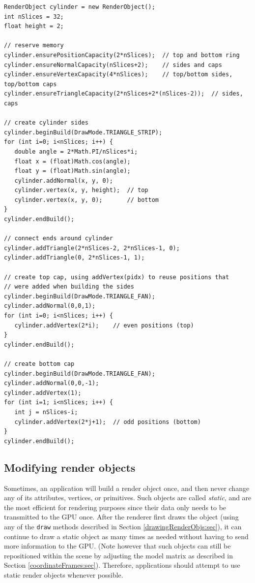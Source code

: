 %
\begin{lstlisting}[caption={Building a cylinder.}, label=renderObjCylinder:lst]
RenderObject cylinder = new RenderObject();
int nSlices = 32;
float height = 2;
      
// reserve memory
cylinder.ensurePositionCapacity(2*nSlices);  // top and bottom ring
cylinder.ensureNormalCapacity(nSlices+2);    // sides and caps
cylinder.ensureVertexCapacity(4*nSlices);    // top/bottom sides, top/bottom caps
cylinder.ensureTriangleCapacity(2*nSlices+2*(nSlices-2));  // sides, caps
      
// create cylinder sides
cylinder.beginBuild(DrawMode.TRIANGLE_STRIP);
for (int i=0; i<nSlices; i++) {
   double angle = 2*Math.PI/nSlices*i;
   float x = (float)Math.cos(angle);
   float y = (float)Math.sin(angle);
   cylinder.addNormal(x, y, 0);
   cylinder.vertex(x, y, height);  // top
   cylinder.vertex(x, y, 0);       // bottom
}
cylinder.endBuild();

// connect ends around cylinder
cylinder.addTriangle(2*nSlices-2, 2*nSlices-1, 0);
cylinder.addTriangle(0, 2*nSlices-1, 1);
      
// create top cap, using addVertex(pidx) to reuse positions that 
// were added when building the sides 
cylinder.beginBuild(DrawMode.TRIANGLE_FAN);
cylinder.addNormal(0,0,1);
for (int i=0; i<nSlices; i++) {
   cylinder.addVertex(2*i);    // even positions (top)
}
cylinder.endBuild();

// create bottom cap
cylinder.beginBuild(DrawMode.TRIANGLE_FAN);
cylinder.addNormal(0,0,-1);
cylinder.addVertex(1);
for (int i=1; i<nSlices; i++) {
   int j = nSlices-i;
   cylinder.addVertex(2*j+1);  // odd positions (bottom)
}
cylinder.endBuild();
\end{lstlisting}
%

\subsection{Modifying render objects}
\label{modifyingObjects:sec}

Sometimes, an application will build a render object once, and then
never change any of its attributes, vertices, or primitives. Such
objects are called {\it static}, and are the most efficient for
rendering purposes since their data only needs to be transmitted to
the GPU once.  After the renderer first draws the object (using any of
the {\tt draw} methods described in Section
\ref{drawingRenderObjs:sec}), it can continue to draw a static object
as many times as needed without having to send more information to the
GPU. (Note however that such objects can still be repositioned within the
scene by adjusting the model matrix as described in Section
\ref{coordinateFrames:sec}).  Therefore, applications should attempt
to use static render objects whenever possible.

